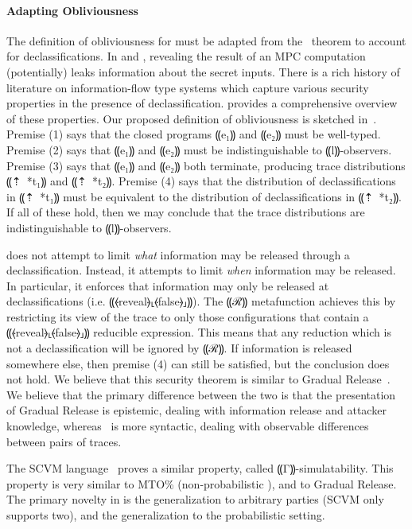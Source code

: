 \paragraph*{Adapting Obliviousness}

The definition of obliviousness for \lang must be adapted from the~ theorem
to account for declassifications. In \mpc and \lang, revealing the result of an MPC computation
(potentially) leaks information about the secret inputs. There is a rich history of literature
on information-flow type systems which capture various security properties in the presence of
declassification. \citet{Sabelfeld2009DeclassificationDA} provides a comprehensive overview of these properties.
Our proposed definition of obliviousness is sketched in~. Premise (1) says that
the closed programs ⸨e₁⸩ and ⸨e₂⸩ must be well-typed. Premise (2) says that ⸨e₁⸩ and ⸨e₂⸩ must be
indistinguishable to ⸨l⸩-observers. Premise (3) says that ⸨e₁⸩ and ⸨e₂⸩ both terminate, producing trace
distributions ⸨⇡~*{t₁}⸩ and ⸨⇡~*{t₂}⸩. Premise (4) says that the distribution of declassifications
in ⸨⇡~*{t₁}⸩ must be equivalent to the distribution of declassifications in ⸨⇡~*{t₂}⸩. If all of
these hold, then we may conclude that the trace distributions are indistinguishable to ⸨l⸩-observers.

 does not attempt to limit \emph{what} information may be released through a declassification.
Instead, it attempts to limit \emph{when} information may be released. In particular, it enforces that information may
only be released at declassifications (i.e. ⸨⦑reveal⦒⸤⦑false⦒⸥⸩). The ⸨ℛ⸩ metafunction achieves this by restricting
its view of the trace to only those configurations that contain a ⸨⦑reveal⦒⸤⦑false⦒⸥⸩ reducible expression. This means
that any reduction which is not a declassification will be ignored by ⸨ℛ⸩. If information is released somewhere else,
then premise (4) can still be satisfied, but the conclusion does not hold. We believe that this security theorem is
similar to Gradual Release~\cite{gradual-release}. We believe that the primary difference between the two is that the presentation
of Gradual Release is epistemic, dealing with information release and attacker knowledge, whereas~
is more syntactic, dealing with observable differences between pairs of traces.

The SCVM language~\cite{liu14scram} proves a similar property, called ⸨Γ⸩-simulatability. This property is very similar to MTO\%
(non-probabilistic ), and to Gradual Release. The primary novelty in \lang is the generalization to
arbitrary parties (SCVM only supports two), and the generalization to the probabilistic setting.

